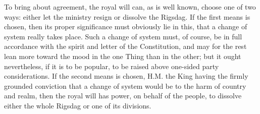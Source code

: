 \documentclass[12pt,a4paper,openany]{book}
\newcommand{\opage}[1]{\marginnote{\footnotesize\textit{[#1]}}}
\begin{document}
To bring about agreement, the royal will can,
as is well known, choose one of two ways: either let the ministry
resign or dissolve the Rigsdag. If the
first means is chosen, then its proper significance must obviously
lie in this, that a change of system really takes place.
Such a change of system must, of course, be
\setcounter{footnote}{0}%
\opage{14}in full accordance with the spirit and letter of the Constitution,
and may for the rest lean more toward the mood in the one
Thing than in the other; but it ought nevertheless, if
it is to be popular, to be raised above one-sided party considerations.
If the second means is chosen, H.M. the King having
the firmly grounded conviction that a change of system would
be to the harm of country and realm, then the royal
will has power, on behalf of the people, to dissolve either
the whole Rigsdag or one of its divisions.
\end{document}
